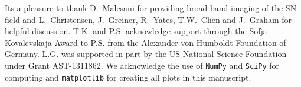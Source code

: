 \documentclass[traditabstract]{aa}
\begin{document}
\begin{acknowledgements}

Its a pleasure to thank D.~Malesani for providing broad-band imaging of the SN field and L.~Christensen, J.~Greiner, R.~Yates, T.W.~Chen and J.~Graham for helpful discussion. T.K. and P.S. acknowledge support through the Sofja Kovalevskaja Award to P.S. from the Alexander von Humboldt Foundation of Germany. L.G. was supported in part by the US National Science Foundation under Grant AST-1311862. We acknowledge the use of \texttt{NumPy} and \texttt{SciPy} \citep{Walt:2011:NAS:1957373.1957466} for computing and \texttt{matplotlib} \citep{Hunter:2007} for creating all plots in this manuscript. 

\end{acknowledgements}



\end{document}
